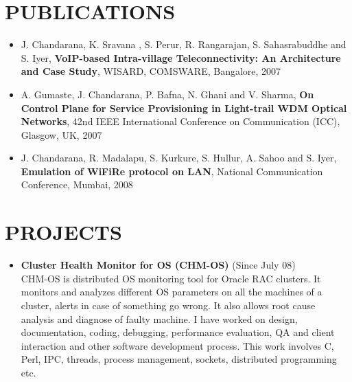 \documentclass{res}
\begin{document}
\begin{resume}
					  \vspace{0.2in} 

				      \section{PUBLICATIONS} 
					  \begin{itemize}
					  \item  J. Chandarana, K. Sravana , S. Perur, R. Rangarajan, S. Sahasrabuddhe and S. Iyer, {\bf VoIP-based
					  Intra-village Teleconnectivity: An Architecture and Case Study}, WISARD, COMSWARE,
					  Bangalore, 2007

					  \item A. Gumaste, J. Chandarana, P. Bafna, N. Ghani and V. Sharma, {\bf On Control Plane for Service
					  Provisioning in Light-trail WDM Optical Networks}, 42nd IEEE International Conference on
					  Communication (ICC), Glasgow, UK, 2007

					  \item J. Chandarana, R. Madalapu, S. Kurkure, S. Hullur, A. Sahoo and S. Iyer, {\bf Emulation of WiFiRe
					  protocol on LAN}, National Communication Conference, Mumbai, 2008

					  \end{itemize}


					  \vspace{0.2in} 

					  \section{PROJECTS}
					  \begin{itemize}
					  \item {\bf Cluster Health Monitor for OS (CHM-OS)} (Since July 08)\\
						  CHM-OS is distributed OS monitoring tool for Oracle RAC clusters. It monitors and analyzes different
						  OS parameters on all the machines of a cluster, alerts in case of something go wrong. It also allows
						  root cause analysis and diagnose of faulty machine. I have worked on design, documentation, coding,
						  debugging, performance evaluation, QA and client interaction and other software development process.
						  This work involves C, Perl, IPC, threads, process management, sockets, distributed programming etc.


\end{itemize}
\end{resume}
\end{document}
